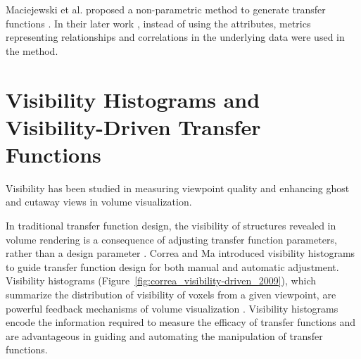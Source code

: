 
Maciejewski et al. proposed a non-parametric method to generate transfer functions \cite{maciejewski_structuring_2009}.
In their later work \cite{maciejewski_abstracting_2013}, instead of using the attributes, metrics representing relationships and correlations in the underlying data were used in the method.


\section{Visibility Histograms and Visibility-Driven Transfer Functions}
Visibility has been studied in measuring viewpoint quality \cite{bordoloi_view_2005} and enhancing ghost and cutaway views \cite{viola_importance-driven_2004} in volume visualization.

In traditional transfer function design, the visibility of structures revealed in volume rendering is a consequence of adjusting transfer function parameters, rather than a design parameter \cite{preim_visual_2013}.
Correa and Ma \cite{correa_visibility-driven_2009} introduced visibility histograms to guide transfer function design for both manual and automatic adjustment.
Visibility histograms (Figure~\ref{fig:correa_visibility-driven_2009}), which summarize the distribution of visibility of voxels from a given viewpoint, are powerful feedback mechanisms of volume visualization \cite{emsenhuber_visibility_2008}.
Visibility histograms encode the information required to measure the efficacy of transfer functions and are advantageous in guiding and automating the manipulation of transfer functions.

